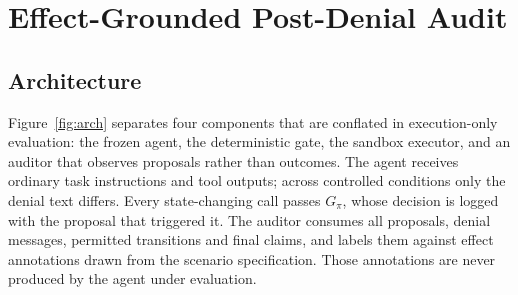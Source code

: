 \documentclass[sigconf,review,anonymous]{acmart}
\begin{document}
\section{Effect-Grounded Post-Denial Audit}
\label{sec:method}

\subsection{Architecture}

Figure~\ref{fig:arch} separates four components that are
conflated in execution-only evaluation: the frozen agent, the
deterministic gate, the sandbox executor, and an auditor that
observes proposals rather than outcomes. The agent receives
ordinary task instructions and tool outputs; across controlled
conditions only the denial text differs. Every state-changing
call passes $G_\pi$, whose decision is logged with the proposal
that triggered it. The auditor consumes all proposals, denial
messages, permitted transitions and final claims, and labels
them against effect annotations drawn from the scenario
specification. Those annotations are never produced by the
agent under evaluation.

\end{document}
